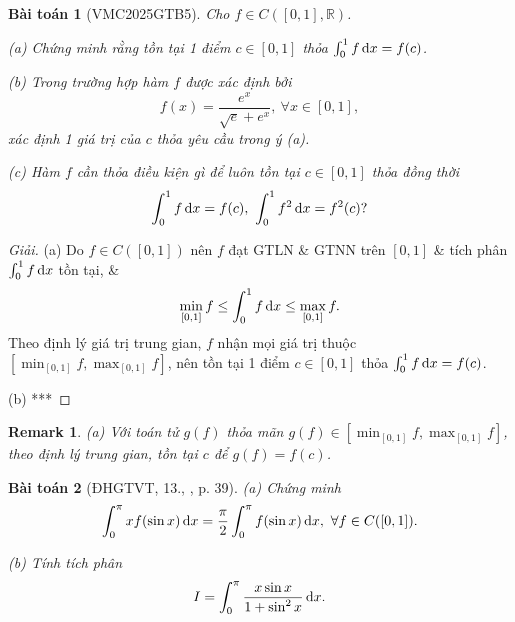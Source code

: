 \documentclass{article}
\newtheorem{baitoan}{Bài toán}
\newtheorem{remark}{Remark}
\begin{document}
\begin{baitoan}[VMC2025GTB5]
	Cho $f\in C([0,1],\mathbb{R})$.
	\item(a) Chứng minh rằng tồn tại 1 điểm $c\in[0,1]$ thỏa $\int_0^1 f\,{\rm d}x = f(c)$.
	\item(b) Trong trường hợp hàm $f$ được xác định bởi
	\begin{equation*}
		f(x) = \frac{e^x}{\sqrt{e} + e^x},\ \forall x\in[0,1],
	\end{equation*}
	xác định 1 giá trị của $c$ thỏa yêu cầu trong ý (a).
	\item(c) Hàm $f$ cần thỏa điều kiện gì để luôn tồn tại $c\in[0,1]$ thỏa đồng thời
	\begin{equation*}
		\int_0^1 f\,{\rm d}x = f(c),\ \int_0^1 f^2\,{\rm d}x = f^2(c)?
	\end{equation*}	
\end{baitoan}

\begin{proof}[Giải]
	(a) Do $f\in C([0,1])$ nên $f$ đạt GTLN \& GTNN trên $[0,1]$ \& tích phân $\int_0^1 f\,{\rm d}x$ tồn tại, \&
	\begin{equation*}
		\min_{[0,1]} f\le\int_0^1 f\,{\rm d}x\le\max_{[0,1]} f.
	\end{equation*}
	Theo định lý giá trị trung gian, $f$ nhận mọi giá trị thuộc $[\min_{[0,1]} f,\max_{[0,1]} f]$, nên tồn tại 1 điểm $c\in[0,1]$ thỏa $\int_0^1 f\,{\rm d}x = f(c)$.
	\item(b) ***
\end{proof}

\begin{remark}
	(a) Với toán tử $g(f)$ thỏa mãn $g(f)\in[\min_{[0,1]} f,\max_{[0,1]} f]$, theo định lý trung gian, tồn tại $c$ để $g(f) = f(c)$.
\end{remark}

\begin{baitoan}[ĐHGTVT, 13., \cite{VMS_VMC2025}, p. 39]
	(a) Chứng minh
	\begin{equation*}
		\int_0^\pi xf(\sin x)\,{\rm d}x = \frac{\pi}{2}\int_0^\pi f(\sin x)\,{\rm d}x,\ \forall f\in C([0,1]).
	\end{equation*}
	\item(b) Tính tích phân
	\begin{equation*}
		I = \int_0^\pi \frac{x\sin x}{1 + \sin^2x}\,{\rm d}x.
	\end{equation*}
\end{baitoan}

\end{document}
